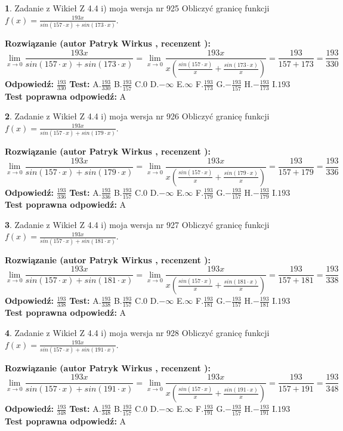 \documentclass[12pt, a4paper]{article}
\theoremstyle{definition} %
\newtheorem{zad}{}
\newcommand{\zadStart}[1]{\begin{zad}#1\newline}
\newcommand{\zadStop}{\end{zad}}
\newcommand{\rozwStart}[2]{\noindent \textbf{Rozwiązanie (autor #1 , recenzent #2): }\newline}
\newcommand{\rozwStop}{\newline}
\newcommand{\odpStart}{\noindent \textbf{Odpowiedź:}\newline}
\newcommand{\odpStop}{\newline}
\newcommand{\testStart}{\noindent \textbf{Test:}\newline}
\newcommand{\testStop}{\newline}
\newcommand{\kluczStart}{\noindent \textbf{Test poprawna odpowiedź:}\newline}
\newcommand{\kluczStop}{\newline}
\begin{document}
\zadStart{Zadanie z Wikieł Z 4.4 i) moja wersja nr 925}
Obliczyć granicę funkcji $f(x)=\frac{193x}{sin(157\cdot x) +sin(173\cdot x)}$.
\zadStop
\rozwStart{Patryk Wirkus}{}
$$\lim\limits_{x\to 0}\frac{193x}{sin(157\cdot x) +sin(173\cdot x)}=\lim\limits_{x\to 0}\frac{193x}{x(\frac{sin(157\cdot x)}{x}+\frac{sin(173\cdot x)}{x})}=\frac{193}{157+173} = \frac{193}{330}$$
\rozwStop
\odpStart
$\frac{193}{330}$
\odpStop
\testStart
A.$\frac{193}{330}$
B.$\frac{193}{157}$
C.$0$
D.$-\infty$
E.$\infty$
F.$\frac{193}{173}$
G.$-\frac{193}{157}$
H.$-\frac{193}{173}$
I.$193$
\testStop
\kluczStart
A
\kluczStop



\zadStart{Zadanie z Wikieł Z 4.4 i) moja wersja nr 926}
Obliczyć granicę funkcji $f(x)=\frac{193x}{sin(157\cdot x) +sin(179\cdot x)}$.
\zadStop
\rozwStart{Patryk Wirkus}{}
$$\lim\limits_{x\to 0}\frac{193x}{sin(157\cdot x) +sin(179\cdot x)}=\lim\limits_{x\to 0}\frac{193x}{x(\frac{sin(157\cdot x)}{x}+\frac{sin(179\cdot x)}{x})}=\frac{193}{157+179} = \frac{193}{336}$$
\rozwStop
\odpStart
$\frac{193}{336}$
\odpStop
\testStart
A.$\frac{193}{336}$
B.$\frac{193}{157}$
C.$0$
D.$-\infty$
E.$\infty$
F.$\frac{193}{179}$
G.$-\frac{193}{157}$
H.$-\frac{193}{179}$
I.$193$
\testStop
\kluczStart
A
\kluczStop



\zadStart{Zadanie z Wikieł Z 4.4 i) moja wersja nr 927}
Obliczyć granicę funkcji $f(x)=\frac{193x}{sin(157\cdot x) +sin(181\cdot x)}$.
\zadStop
\rozwStart{Patryk Wirkus}{}
$$\lim\limits_{x\to 0}\frac{193x}{sin(157\cdot x) +sin(181\cdot x)}=\lim\limits_{x\to 0}\frac{193x}{x(\frac{sin(157\cdot x)}{x}+\frac{sin(181\cdot x)}{x})}=\frac{193}{157+181} = \frac{193}{338}$$
\rozwStop
\odpStart
$\frac{193}{338}$
\odpStop
\testStart
A.$\frac{193}{338}$
B.$\frac{193}{157}$
C.$0$
D.$-\infty$
E.$\infty$
F.$\frac{193}{181}$
G.$-\frac{193}{157}$
H.$-\frac{193}{181}$
I.$193$
\testStop
\kluczStart
A
\kluczStop



\zadStart{Zadanie z Wikieł Z 4.4 i) moja wersja nr 928}
Obliczyć granicę funkcji $f(x)=\frac{193x}{sin(157\cdot x) +sin(191\cdot x)}$.
\zadStop
\rozwStart{Patryk Wirkus}{}
$$\lim\limits_{x\to 0}\frac{193x}{sin(157\cdot x) +sin(191\cdot x)}=\lim\limits_{x\to 0}\frac{193x}{x(\frac{sin(157\cdot x)}{x}+\frac{sin(191\cdot x)}{x})}=\frac{193}{157+191} = \frac{193}{348}$$
\rozwStop
\odpStart
$\frac{193}{348}$
\odpStop
\testStart
A.$\frac{193}{348}$
B.$\frac{193}{157}$
C.$0$
D.$-\infty$
E.$\infty$
F.$\frac{193}{191}$
G.$-\frac{193}{157}$
H.$-\frac{193}{191}$
I.$193$
\testStop
\kluczStart
A
\kluczStop
\end{document}
